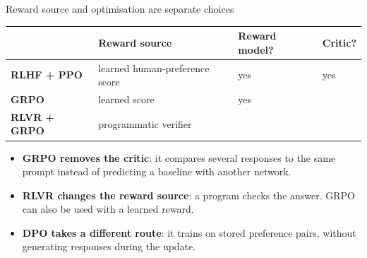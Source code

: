 \documentclass[aspectratio=169,10pt]{beamer}
\begin{document}
\begin{frame}{Reward source and optimisation are separate choices}
  \centering
  \small
  \begin{tabular}{@{}L{2.6cm} L{4.1cm} C{1.5cm} C{1.5cm}@{}}
    \toprule
    & \textbf{Reward source} & \textbf{Reward model?} & \textbf{Critic?}\\
    \midrule
    \textbf{RLHF + PPO} & learned human-preference score & yes & yes\\
    \textbf{GRPO} & learned score & yes & \\
    \textbf{RLVR + GRPO} & programmatic verifier &  & \\
    \bottomrule
  \end{tabular}

  \vspace{0.3em}
  \raggedright\small
  \begin{itemize}
    \item \textbf{GRPO removes the critic}: it compares several responses to
      the same prompt instead of predicting a baseline with another network.
    \item \textbf{RLVR changes the reward source}: a program checks the answer.
      GRPO can also be used with a learned reward.
    \item \textbf{DPO takes a different route}: it trains on stored preference
      pairs, without generating responses during the update.
  \end{itemize}
\end{frame}
\end{document}
